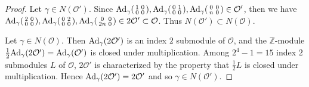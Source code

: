 \documentclass{article}
\theoremstyle{plain}
\theoremstyle{definition}
\theoremstyle{remark}
\newcommand{\Z}{{\mathbb Z}}
\begin{document}
\begin{proof}
Let 
$\gamma \in N(\mathcal{O}')$. 
Since 
$
{\rm Ad\/}_{\gamma}
(
\begin{smallmatrix}
1 & 0 \\
0 & 0 
\end{smallmatrix}
), 
{\rm Ad\/}_{\gamma}
(
\begin{smallmatrix}
0 & 1 \\
0 & 0 
\end{smallmatrix}
),
{\rm Ad\/}_{\gamma}
(
\begin{smallmatrix}
0 & 0 \\
n & 0 
\end{smallmatrix}
) 
\in \mathcal{O}'$, 
then we have 
$
{\rm Ad\/}_{\gamma}
(
\begin{smallmatrix}
2 & 0 \\
0 & 0 
\end{smallmatrix}
), 
{\rm Ad\/}_{\gamma}
(
\begin{smallmatrix}
0 & 2 \\
0 & 0 
\end{smallmatrix}
),
{\rm Ad\/}_{\gamma}
(
\begin{smallmatrix}
0 & 0 \\
2n & 0 
\end{smallmatrix}
) 
\in 2\mathcal{O}' \subset \mathcal{O}$.  
Thus   
$N(\mathcal{O}') \subset N(\mathcal{O})$. 







Let 
$\gamma \in N(\mathcal{O})$. 
Then 
${\rm Ad\/}_{\gamma}(2\mathcal{O}')$ 
is an index $2$ submodule of $\mathcal{O}$, 
and the ${\Z}$-module 
$\frac{1}{2}{\rm Ad\/}_{\gamma}(2\mathcal{O}') = {\rm Ad\/}_{\gamma}(\mathcal{O}')$ 
is closed under multiplication. 
Among 
$2^{4}-1 = 15$ index $2$ submodules $L$ of $\mathcal{O}$, 
$2\mathcal{O}'$ is characterized by 
the property that 
$\frac{1}{2}L$ is closed under multiplication. 
Hence 
${\rm Ad\/}_{\gamma}(2\mathcal{O}') = 2\mathcal{O}'$ 
and so 
$\gamma \in N(\mathcal{O}')$. 
\end{proof}  
\end{document}
